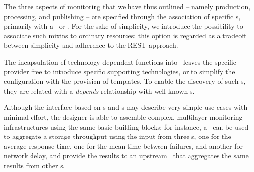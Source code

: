 \documentclass[12pt]{article}  %
\begin{document}
The three aspects of monitoring that we have thus outlined -- namely production, processing, and publishing -- are specified through the association of specific \mi s, primarily with a \sens\ or \coll. For the sake of simplicity, we introduce the possibility to associate such mixins to ordinary resources: this option is regarded as a tradeoff between simplicity and adherence to the REST approach.

The incapsulation of technology dependent functions into \mi\ leaves the specific provider free to introduce specific supporting technologies, or to simplify the configuration with the provision of templates. To enable the discovery of such \mi s, they are related with a {\em depends} relationship with well-known \mi s.



Although the interface based on \sens s and \coll s may describe very simple use cases with minimal effort, the designer is able to assemble complex, multilayer monitoring infrastructures using the same basic building blocks: for instance, a \sens\ can be used to aggregate a storage throughput using the input from three \coll s, one for the average response time, one for the mean time between failures, and another for network delay, and provide the results to an upstream \sens\ that aggregates the same results from other \sens s.


\end{document}
